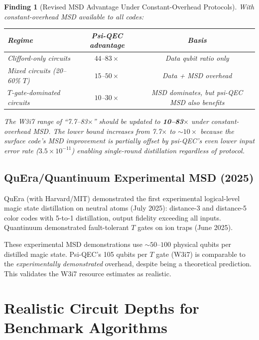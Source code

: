 \documentclass[11pt]{article}
\newtheorem{finding}[theorem]{Finding}
\theoremstyle{definition}
\theoremstyle{remark}
\newcommand{\ee}[1]{\times 10^{#1}}
\begin{document}
\begin{finding}[Revised MSD Advantage Under Constant-Overhead Protocols]
\label{finding:revised-msd}
With constant-overhead MSD available to all codes:
\begin{center}
\begin{tabular}{@{}lcc@{}}
\toprule
Regime & Psi-QEC advantage & Basis \\
\midrule
Clifford-only circuits & $44$--$83\times$ & Data qubit ratio only \\
Mixed circuits (20--60\% $T$) & $15$--$50\times$ & Data + MSD overhead \\
$T$-gate-dominated circuits & $10$--$30\times$ & MSD dominates, but
  psi-QEC MSD also benefits \\
\bottomrule
\end{tabular}
\end{center}
The W3i7 range of ``7.7--83$\times$'' should be updated to
\textbf{10--83$\times$} under constant-overhead MSD.  The lower bound
\emph{increases} from 7.7$\times$ to $\sim 10\times$ because the
surface code's MSD improvement is partially offset by psi-QEC's
even lower input error rate ($3.5\ee{-11}$) enabling single-round
distillation regardless of protocol.
\end{finding}

\subsection{QuEra/Quantinuum Experimental MSD (2025)}
\label{sec:experimental-msd}

QuEra (with Harvard/MIT) demonstrated the first experimental logical-level
magic state distillation on neutral atoms (July 2025): distance-3 and
distance-5 color codes with 5-to-1 distillation, output fidelity exceeding
all inputs.  Quantinuum demonstrated fault-tolerant $T$ gates on ion traps
(June 2025).

These experimental MSD demonstrations use $\sim 50$--$100$ physical qubits
per distilled magic state.  Psi-QEC's 105 qubits per $T$ gate (W3i7) is
comparable to the \emph{experimentally demonstrated} overhead, despite
being a theoretical prediction.  This validates the W3i7 resource estimates
as realistic.

\section{Realistic Circuit Depths for Benchmark Algorithms}
\label{sec:circuit-depths}
\end{document}
